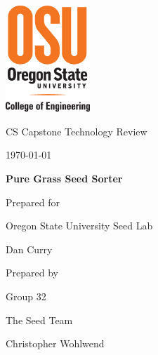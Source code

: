 \documentclass[onecolumn, draftclsnofoot,10pt, compsoc]{IEEEtran}
\def \CapstoneTeamName{		The Seed Team}
\def \CapstoneTeamNumber{		32}
\def \GroupMemberOne{			Bharath Padmaraju}
\def \GroupMemberTwo{			Kevin Deming}
\def \GroupMemberThree{			Haoxuan Zhan}
\def \GroupMemberFour{			Cong Yang}
\def \GroupMemberFive{			Christopher Wohlwend}
\def \CapstoneProjectName{		Pure Grass Seed Sorter}
\def \CapstoneSponsorCompany{	Oregon State University Seed Lab}
\def \CapstoneSponsorPerson{		Dan Curry}
\def \DocType{	%
				Technology Review
				}
\newcommand{\NameSigPair}[1]{\par
\makebox[2.75in][r]{#1} \hfil 	\makebox[3.25in]{\makebox[2.25in]{\hrulefill} \hfill		\makebox[.75in]{\hrulefill}}
\par\vspace{-12pt} \textit{\tiny\noindent
\makebox[2.75in]{} \hfil		\makebox[3.25in]{\makebox[2.25in][r]{Signature} \hfill	\makebox[.75in][r]{Date}}}}
\renewcommand{\NameSigPair}[1]{#1}
\begin{document}
\begin{titlepage}
    \begin{singlespace}
    	\includegraphics[height=4cm]{coe_v_spot1}
        \hfill 
        \par\vspace{.2in}
        \centering
        \scshape{
            \huge CS Capstone \DocType \par
            {\large\today}\par
            \vspace{.5in}
            \textbf{\Huge\CapstoneProjectName}\par
            \vfill
            {\large Prepared for}\par
            \Huge \CapstoneSponsorCompany\par
            \vspace{5pt}
            {\Large\NameSigPair{\CapstoneSponsorPerson}\par}
            {\large Prepared by }\par
            Group\CapstoneTeamNumber\par
            \CapstoneTeamName\par 
            \vspace{5pt}
            {\Large
                \NameSigPair{\GroupMemberFive}\par
            }
            \vspace{20pt}
        }
        \begin{abstract}

\end{abstract}
\end{singlespace}
\end{titlepage}
\end{document}
